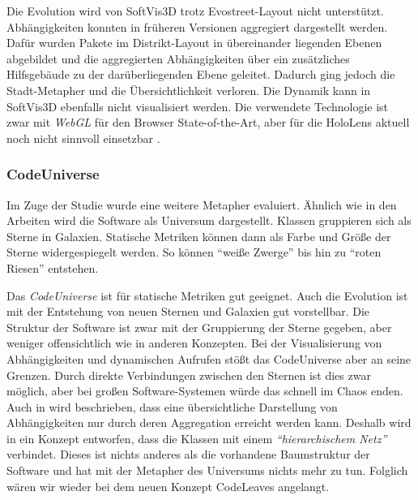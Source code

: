 Die Evolution wird von SoftVis3D trotz Evostreet-Layout nicht unterstützt. Abhängigkeiten konnten in früheren Versionen aggregiert dargestellt werden. Dafür wurden Pakete im Distrikt-Layout in übereinander liegenden Ebenen abgebildet und die aggregierten Abhängigkeiten über ein zusätzliches Hilfsgebäude zu der darüberliegenden Ebene geleitet. Dadurch ging jedoch die Stadt-Metapher und die Übersichtlichkeit verloren. Die Dynamik kann in SoftVis3D ebenfalls nicht visualisiert werden. Die verwendete Technologie ist zwar mit \emph{WebGL} für den Browser State-of-the-Art, aber für die HoloLens aktuell noch nicht sinnvoll einsetzbar \cite{puetz2017softwarevisualisierung}.

\subsubsection*{CodeUniverse}

Im Zuge der Studie \cite{puetz2017softwarevisualisierung} wurde eine weitere Metapher evaluiert. Ähnlich wie in den Arbeiten \cite{graham2004solar, balzer2004software} wird die Software als Universum dargestellt. Klassen gruppieren sich als Sterne in Galaxien. Statische Metriken können dann als Farbe und Größe der Sterne widergespiegelt werden. So können "`weiße Zwerge"' bis hin zu "`roten Riesen"' entstehen.

Das \textit{CodeUniverse} ist für statische Metriken gut geeignet. Auch die Evolution ist mit der Entstehung von neuen Sternen und Galaxien gut vorstellbar. Die Struktur der Software ist zwar mit der Gruppierung der Sterne gegeben, aber weniger offensichtlich wie in anderen Konzepten. Bei der Visualisierung von Abhängigkeiten und dynamischen Aufrufen stößt das CodeUniverse aber an seine Grenzen. Durch direkte Verbindungen zwischen den Sternen ist dies zwar möglich, aber bei großen Software-Systemen würde das schnell im Chaos enden. Auch in \cite{balzer2004software} wird beschrieben, dass eine übersichtliche Darstellung von Abhängigkeiten nur durch deren Aggregation erreicht werden kann. Deshalb wird in \cite{balzer2004software} ein Konzept entworfen, dass die Klassen mit einem \emph{"`hierarchischem Netz"'} verbindet. Dieses ist nichts anderes als die vorhandene Baumstruktur der Software und hat mit der Metapher des Universums nichts mehr zu tun. Folglich wären wir wieder bei dem neuen Konzept CodeLeaves angelangt.


